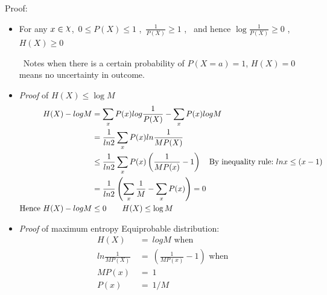 \documentclass[24pt]{article}
\DeclareRobustCommand{\rchi}{{\mathpalette\irchi\relax}}
\newcommand{\irchi}[2]{\raisebox{\depth}{$#1\chi$}} %
\begin{document}
Proof:
\begin{itemize}
\item For any $x \in \rchi $, \,$0 \le P(X) \le 1$ , \,$\frac{1}{P(X)} \ge 1 $ , \, and hence $\log \frac{1}{P(X)} \ge 0$ , $H(X) \ge 0$

\quad \  Notes when there is a certain probability of $P(X=a) = 1$, $H(X) = 0$ means no uncertainty in outcome.

\item \textit{Proof} of $H(X)\le \log M$
\begin{align*} 
H(X) - logM &= \sum_xP(x)log\frac{1}{P(X)}-\sum_xP(x)logM \\ 
&= \frac{1}{ln2}\sum_xP(x)ln\frac{1}{MP(X)} \\
&\le \frac{1}{ln2}\sum_xP(x)\left(\frac{1}{MP(x)} - 1\right) \textrm{\quad By inequality rule:\ } lnx \le (x-1)\\
&= \frac{1}{ln2}\left(\sum_x\frac{1}{M} - \sum_xP(x)\right) = 0 \\
\textrm{Hence } H(X) - logM &\le 0 \qquad H(X)\le \log M
\end{align*}

\item \textit{Proof} of maximum entropy Equiprobable distribution: 
\begin{align*}
H(X) \ &= \ logM \textrm{ when } \\
ln\frac{1}{MP(X)} \ &= \ \left(\frac{1}{MP(x)} - 1\right) \textrm{ when } \\
MP(x) \ &= \ 1 \\
P(x) \ &= \ 1/M
\end{align*}
\end{itemize}
\end{document}
